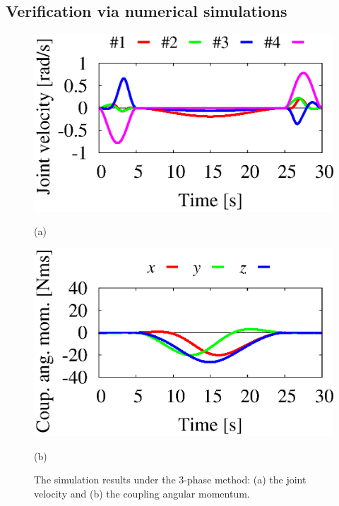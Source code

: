 \subsection{Verification via numerical simulations}
%
\begin{figure}[t]
  \centering
  \begin{minipage}[h]{0.4\linewidth}
    \centering
    \includegraphics[width=1.0\linewidth]{fig/chapter4/PTP/3phase/U01_joint_velo_1-4.eps}
    \footnotesize\par{(a)}
  \end{minipage}
  \begin{minipage}[h]{0.4\linewidth}
    \centering
    \includegraphics[width=1.0\linewidth]{fig/chapter4/PTP/3phase/U04_coup_ang_mom.eps}
    \footnotesize\par{(b)}
  \end{minipage}
  \caption{The simulation results under the 3-phase method:
  (a) the joint velocity and (b) the coupling angular momentum.}
  \label{fig:RES_3PHASE}
\end{figure}
